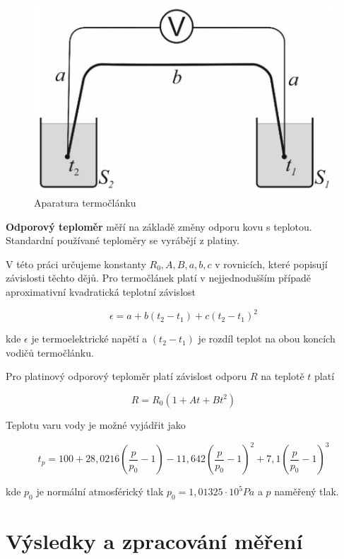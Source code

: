\begin{figure}[h]
    \centering
    \includegraphics[width=0.5\linewidth]{8 - Kalibrace odporového teploměru a termočlánku//Prototkol - studium povrchového napětí//img/Aparatura termočlánku.png}
    \caption{Aparatura termočlánku}
    \label{fig:aparatura-termoclanku}
\end{figure}

\textbf{Odporový teploměr} měří na základě změny odporu kovu s teplotou. Standardní používané teploměry se vyrábějí z platiny.

V této práci určujeme konstanty $R_0, A, B, a, b, c$ v rovnicích, které popisují závislosti těchto dějů. Pro termočlánek platí v nejjednodušším případě aproximativní kvadratická teplotní závislost

\begin{equation}
    \epsilon = a + b(t_2 - t_1) + c(t_2 - t_1)^2
\end{equation}

kde $\epsilon$ je termoelektrické napětí a $(t_2 - t_1)$ je rozdíl teplot na obou koncích vodičů termočlánku.

Pro platinový odporový teploměr platí závislost odporu $R$ na teplotě $t$ platí

\begin{equation}
    R = R_0 (1 + At + Bt^2)
\end{equation}

Teplotu varu vody je možné vyjádřit jako

\begin{equation}
    t_p = 100 + 28,0216 \left( \frac{p}{p_0} - 1 \right) - 11,642 \left( \frac{p}{p_0} - 1 \right)^2 + 7,1 \left( \frac{p}{p_0} - 1 \right)^3
\end{equation}

kde $p_0$ je normální atmosférický tlak $p_0 = 1,01325 \cdot 10^5 Pa$ a $p$ naměřený tlak.

\section{Výsledky a zpracování měření}

